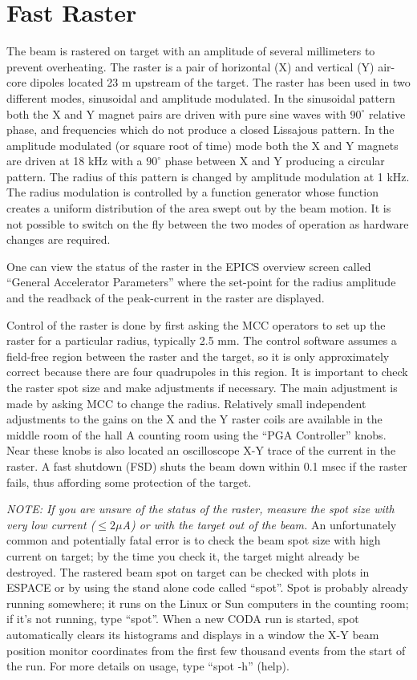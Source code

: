 \section{Fast Raster}

The beam is rastered on target with an amplitude of
several millimeters to prevent overheating.  
The raster is a pair of horizontal (X) and vertical (Y)
air-core dipoles located 23 m upstream of the
target. The raster has been used in two different modes,
sinusoidal and amplitude modulated. In the sinusoidal pattern
both the X and Y magnet pairs are driven with pure sine waves
with $90^{\circ}$ relative phase, 
and frequencies which do not produce a closed Lissajous pattern.
In the amplitude modulated (or square root of time) mode  
both the X and Y magnets are driven at 18 kHz with
a $90^{\circ}$ phase between X and Y producing  a circular
pattern. The radius of this pattern is changed by amplitude
modulation at 1 kHz. The radius modulation
is controlled by a function generator whose function
creates a uniform distribution of the area swept out
by the beam motion. It is not possible to switch on the fly
between the two modes of operation as hardware changes are required.

One can view the status of the raster in the
EPICS overview screen called ``General Accelerator
Parameters'' where the set-point for the radius amplitude
and the readback of the peak-current in the raster are displayed.

Control of the raster is done by first asking the MCC
operators to set up the raster for a particular radius, 
typically 2.5 mm.
The control software assumes a field-free region between
the raster and the target, so it is only approximately
correct because there are four quadrupoles in this region.
It is important to check the raster spot size and
make adjustments if necessary.  The main adjustment is made
by asking MCC to change the radius.
Relatively small independent adjustments to the 
gains on the X and the Y raster
coils are available in the middle room of the hall A
counting room using the ``PGA Controller'' knobs.
Near these knobs is also located an oscilloscope X-Y trace
of the current in the raster.  A fast shutdown (FSD) shuts
the beam down within 0.1 msec if the raster fails, thus
affording some protection of the target.

{\it NOTE:  If you are unsure of the status of the raster,
measure the spot size with very low current ($\le 2 \mu$A) or with
the target out of the beam.}  An unfortunately common and 
potentially fatal error 
is to check the beam spot size with high current on target; by
the time you check it, the target might already be destroyed.
The rastered beam spot on target can be checked with
plots in ESPACE or by using the stand alone code called ``spot''.
Spot is probably already running somewhere; it runs on the 
Linux or Sun computers in the counting room; if it's not
running, type ``spot''.  When a new CODA run is started,
spot automatically clears its histograms and displays 
in a window the X-Y beam position monitor
coordinates from the first few thousand events from the
start of the run.  
For more details on usage, type ``spot -h'' (help).


